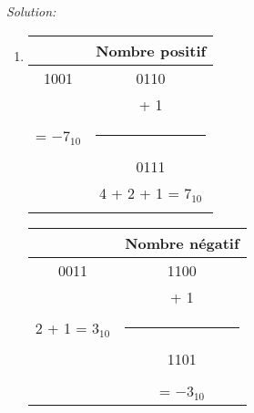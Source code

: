 \documentclass{article}
\newenvironment{solution}
    {\textit{Solution:}}
    {}
\begin{document}
\begin{solution}
\begin{enumerate}
        \item
        
        
        \begin{tabular}{|c|c|}
        \hline
         & Nombre positif\\
        \hline    
        1001                &       0110                        \\
        \hspace{101pt}      &       + \hspace{5pt} 1           \\
        = $-7_{10}$          &       \rule{1in}{1pt}             \\
        \hspace{5pt}        &       0111                        \\
        \hspace{5pt}        &       4 + 2 + 1 = $7_{10}$        \\
                            &       \hspace{100pt}              \\
        \hline
        \end{tabular}
        
        \hspace{40pt}
        
        \begin{tabular}{|c|c|}
        \hline
        & Nombre négatif\\
        \hline    
        0011                        &       1100                \\
                                    &       + \hspace{5pt} 1   \\
        2 + 1 = $3_{10}$            &       \rule{1in}{1pt}     \\
        \hspace{5pt}                &       1101                \\
        \hspace{100pt}              &       \hspace{100pt}      \\
                                    &       = $-3_{10}$          \\
        \hline
        \end{tabular}
        
        \hspace{40pt}
        

\end{enumerate}
\end{solution}
\end{document}
